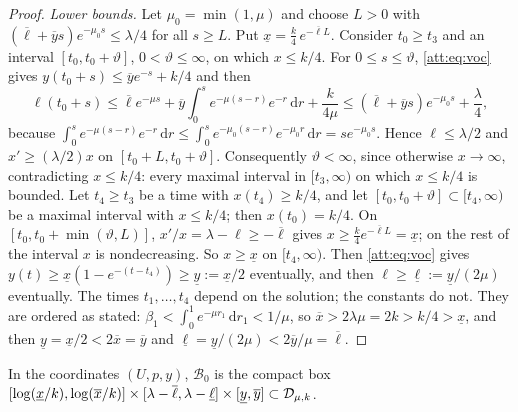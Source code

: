 \begin{proof}
\emph{Lower bounds.} Let $\mu_0=\min(1,\mu)$ and choose $L>0$ with $(\overline\ell+\overline ys)e^{-\mu_0s}\le\lambda/4$ for all $s\ge L$. Put $\underline x=\tfrac k4\,e^{-\overline\ell L}$. Consider $t_0\ge t_3$ and an interval $[t_0,t_0+\vartheta]$, $0<\vartheta\le\infty$, on which $x\le k/4$. For $0\le s\le\vartheta$, \eqref{att:eq:voc} gives $y(t_0+s)\le\overline ye^{-s}+k/4$ and then
\[
\ell(t_0+s)\le\overline\ell e^{-\mu s}+\overline y\int_0^se^{-\mu(s-r)}e^{-r}\,\mathrm dr+\frac{k}{4\mu}\le(\overline\ell+\overline ys)e^{-\mu_0s}+\frac\lambda4 ,
\]
because $\int_0^se^{-\mu(s-r)}e^{-r}\,\mathrm dr\le\int_0^se^{-\mu_0(s-r)}e^{-\mu_0r}\,\mathrm dr=se^{-\mu_0s}$. Hence $\ell\le\lambda/2$ and $x'\ge(\lambda/2)x$ on $[t_0+L,t_0+\vartheta]$. Consequently $\vartheta<\infty$, since otherwise $x\to\infty$, contradicting $x\le k/4$: every maximal interval in $[t_3,\infty)$ on which $x\le k/4$ is bounded. Let $t_4\ge t_3$ be a time with $x(t_4)\ge k/4$, and let $[t_0,t_0+\vartheta]\subset[t_4,\infty)$ be a maximal interval with $x\le k/4$; then $x(t_0)=k/4$. On $[t_0,t_0+\min(\vartheta,L)]$, $x'/x=\lambda-\ell\ge-\overline\ell$ gives $x\ge\tfrac k4e^{-\overline\ell L}=\underline x$; on the rest of the interval $x$ is nondecreasing. So $x\ge\underline x$ on $[t_4,\infty)$. Then \eqref{att:eq:voc} gives $y(t)\ge\underline x(1-e^{-(t-t_4)})\ge\underline y:=\underline x/2$ eventually, and then $\ell\ge\underline\ell:=\underline y/(2\mu)$ eventually. The times $t_1,\dots,t_4$ depend on the solution; the constants do not. They are ordered as stated: $\beta_1<\int_0^1e^{-\mu r_1}\,\mathrm dr_1<1/\mu$, so $\overline x>2\lambda\mu=2k>k/4>\underline x$, and then $\underline y=\underline x/2<2\overline x=\overline y$ and $\underline\ell=\underline y/(2\mu)<2\overline y/\mu=\overline\ell$.
\end{proof}
In the coordinates $(U,p,y)$, $\mathcal B_0$ is the compact box $[\log(\underline x/k),\log(\overline x/k)]\times[\lambda-\overline\ell,\lambda-\underline\ell]\times[\underline y,\overline y]\subset\mathcal D_{\mu,k}$.

